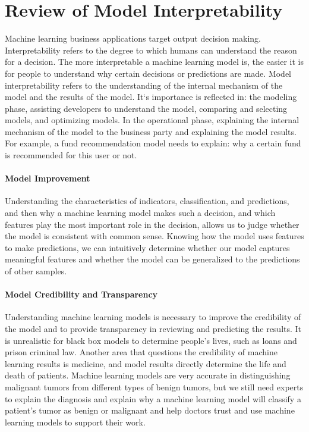 \section{Review of Model Interpretability}
Machine learning business applications target output decision making. Interpretability refers to the degree to which humans can understand the reason for a decision. The more interpretable a machine learning model is, the easier it is for people to understand why certain decisions or predictions are made. Model interpretability refers to the understanding of the internal mechanism of the model and the results of the model. It‘s importance is reflected in: the modeling phase, assisting developers to understand the model, comparing and selecting models, and optimizing models. In the operational phase, explaining the internal mechanism of the model to the business party and explaining the model results. For example, a fund recommendation model needs to explain: why a certain fund is recommended for this user or not.

\paragraph{Model Improvement}
Understanding the characteristics of indicators, classification, and predictions, and then why a machine learning model makes such a decision, and which features play the most important role in the decision, allows us to judge whether the model is consistent with common sense. Knowing how the model uses features to make predictions, we can intuitively determine whether our model captures meaningful features and whether the model can be generalized to the predictions of other samples.

\paragraph{Model Credibility and Transparency}
Understanding machine learning models is necessary to improve the credibility of the model and to provide transparency in reviewing and predicting the results. It is unrealistic for black box models to determine people's lives, such as loans and prison criminal law. Another area that questions the credibility of machine learning results is medicine, and model results directly determine the life and death of patients. Machine learning models are very accurate in distinguishing malignant tumors from different types of benign tumors, but we still need experts to explain the diagnosis and explain why a machine learning model will classify a patient's tumor as benign or malignant and help doctors trust and use machine learning models to support their work.
